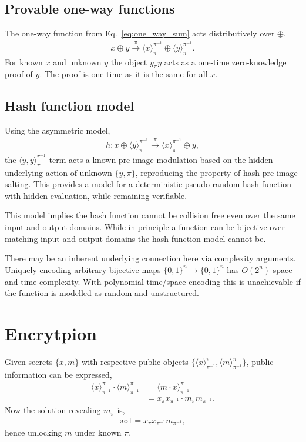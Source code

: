 \documentclass[twocolumn, aps, amsmath, amssymb, nofootinbib, superscriptaddress, longbibliography, doublefloatfix, table-of-contents, eqsecnum, rmp]{revtex4-2}
\def\braid#1#2#3#4{\langle#1,#2\rangle_{#3}^{#4}}
\def\selfbraid#1#2#3{\langle#1\rangle_{#2}^{#3}}
\begin{document}
\subsection{Provable one-way functions}

The one-way function from Eq.~\eqref{eq:one_way_sum} acts distributively over $\oplus$,
\begin{align}
	x\oplus y \xrightarrow{\pi} \selfbraid{x}{\pi}{\pi^{-1}} \oplus \selfbraid{y}{\pi}{\pi^{-1}}.
\end{align}
For known $x$ and unknown $y$ the object $y_\pi y$ acts as a one-time zero-knowledge proof of $y$. The proof is one-time as it is the same for all $x$.

\subsection{Hash function model}

Using the asymmetric model,
\begin{align}
	h: x\oplus \selfbraid{y}{\pi}{\pi^{-1}} \xrightarrow{\pi} \selfbraid{x}{\pi}{\pi^{-1}} \oplus y,
\end{align}
the $\braid{y}{y}{\pi}{\pi^{-1}}$ term acts a known pre-image modulation based on the hidden underlying action of unknown $\{y,\pi\}$, reproducing the property of hash pre-image salting. This provides a model for a deterministic pseudo-random hash function with hidden evaluation, while remaining verifiable.

This model implies the hash function cannot be collision free even over the same input and output domains. While in principle a function can be bijective over matching input and output domains the hash function model cannot be.

There may be an inherent underlying connection here via complexity arguments. Uniquely encoding arbitrary bijective maps \mbox{$\{0,1\}^n\to \{0,1\}^n$} has $O(2^n)$ space and time complexity. With polynomial time/space encoding this is unachievable if the function is modelled as random and unstructured.

\section{Encrytpion}

Given secrets $\{x,m\}$ with respective public objects $\{\selfbraid{x}{\pi^{-1}}{\pi},\selfbraid{m}{{\pi}^{-1}}{\pi}\}$, public information can be expressed,
\begin{align}
	\selfbraid{x}{\pi^{-1}}{\pi} \cdot \selfbraid{m}{{\pi}^{-1}}{\pi} &= \selfbraid{m\cdot x}{{\pi}^{-1}}{\pi} \nonumber\\
	&= x_{\pi}x_{\pi^{-1}} \cdot m_\pi m_{\pi^{-1}}.
\end{align}
Now the solution revealing $m_\pi$ is,
\begin{align}
	\mathtt{sol} = x_\pi x_{\pi^{-1}} m_{\pi^{-1}},
\end{align}
hence unlocking $m$ under known $\pi$.
\end{document}
